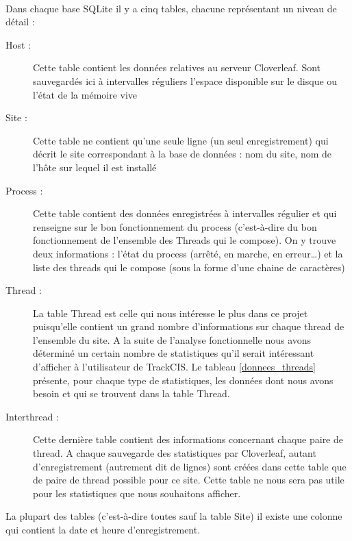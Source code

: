 			\paragraph{}
			Dans chaque base SQLite il y a cinq tables, chacune représentant
			un niveau de détail :
			\begin{description}
			  \item[Host :] Cette table contient les données relatives au serveur
			  Cloverleaf. Sont sauvegardés ici à intervalles réguliers l'espace
			  disponible sur le disque ou l'état de la mémoire vive
			  \item[Site :] Cette table ne contient qu'une seule ligne (un seul
			  enregistrement) qui décrit le site correspondant à la base de données : nom
			  du site, nom de l'hôte sur lequel il est installé
			  \item[Process :] Cette table contient des données enregistrées à
			  intervalles régulier et qui renseigne sur le bon fonctionnement du process
			  (c'est-à-dire du bon fonctionnement de l'ensemble des Threads qui le
			  compose). On y trouve deux informations : l'état du process (arrêté, en
			  marche, en erreur\ldots) et la liste des threads qui le compose (sous la
			  forme d'une chaine de caractères)
			  \item[Thread :] La table Thread est celle qui nous intéresse le plus dans
			  ce projet puisqu'elle contient un grand nombre d'informations sur chaque
			  thread de l'ensemble du site. A la suite de l'analyse fonctionnelle nous
			  avons déterminé un certain nombre de statistiques qu'il serait intéressant
			  d'afficher à l'utilisateur de TrackCIS. Le tableau \ref{donnees_threads}
			  présente, pour chaque type de statistiques, les données dont nous avons
			  besoin et qui se trouvent dans la table Thread.
			  \item[Interthread :] Cette dernière table contient des informations
			  concernant chaque paire de thread. A chaque sauvegarde des statistiques par
			  Cloverleaf, autant d'enregistrement (autrement dit de lignes) sont créées
			  dans cette table que de paire de thread possible pour ce site. Cette table
			  ne nous sera pas utile pour les statistiques que nous souhaitons afficher.
			\end{description}
			La plupart des tables (c'est-à-dire toutes sauf la table Site) il existe une
			colonne qui contient la date et heure d'enregistrement.
